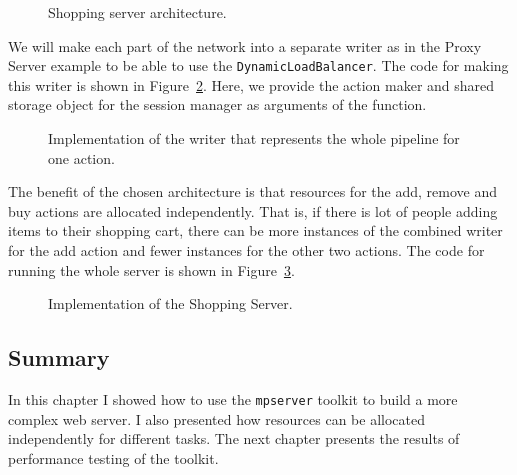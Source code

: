\begin{figure}[h]
\caption[scale=1.0]{Shopping server architecture.}
\label{fig:shoppingDesign}
\end{figure}

We will make each part of the network into a separate writer as in
the Proxy Server example to be able to use the \texttt{DynamicLoadBalancer}.
The code for making this writer is shown in Figure~\ref{fig:shoppingWriter}.
Here, we provide the action maker and shared storage object for the session manager 
as arguments of the function.

\begin{figure}[h]
 
\caption[scale=1.0]{Implementation of the writer that represents the whole
pipeline for one action.}
\label{fig:shoppingWriter}
\end{figure}

The benefit of the chosen architecture is that resources for the add, remove
and buy actions are allocated independently. That is, if there is lot of 
people adding items to their shopping cart, there can be more instances
of the combined writer for the add action and fewer instances for the
other two actions. The code for running the whole server is shown
in Figure~\ref{fig:ShoppingCode}.

\begin{figure}
 
\caption[scale=1.0]{Implementation of the Shopping Server.}
\label{fig:ShoppingCode}
\end{figure}

\subsection{Summary}
In this chapter I showed how to use the \texttt{mpserver} toolkit
to build a more complex web server. I also presented how resources can
be allocated independently for different tasks. The next chapter 
presents the results of performance testing of the toolkit.


